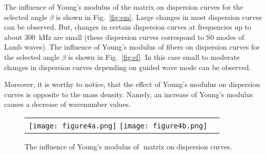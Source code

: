 \documentclass[]{spie}  %
\newcommand{\myfigscale}{0.9}
\begin{document}
The influence of Young's modulus of the matrix on dispersion curves for the selected angle 
\(\beta\) is shown in Fig.~\ref{fig:em}. 
Large changes in most dispersion curves can be observed. 
But, changes in certain dispersion curves at frequencies up to about 300~kHz are small (these dispersion curves correspond to S0 modes of Lamb waves).
The influence of Young's modulus of fibers on dispersion curves for the selected angle 
\(\beta\) is shown in Fig.~\ref{fig:ef}. 
In this case small to moderate changes in dispersion curves depending on guided wave mode can be observed. 

Moreover, it is worthy to notice, that the effect of Young's modulus on dispersion curves is opposite to the mass density. 
Namely, an increase of  Young's modulus causes a decrease of wavenumber values.
\begin{figure} [ht]
	\begin{center}
		\begin{tabular}{cc} %
			\texttt{[image: figure4a.png]}
			\texttt{[image: figure4b.png]}
		\end{tabular}
	\end{center}
	\caption[] 
	{\DIFdel{ \label{fig:em}} 
		The influence of Young's modulus of matrix on dispersion curves. \label{fig:em2}}
\end{figure} 
\end{document}
